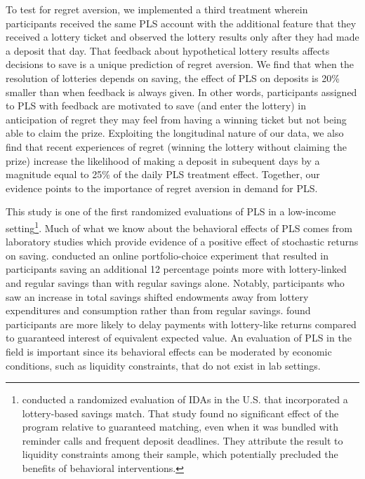 \documentclass[12pt, titlepage]{article}
\begin{document}
	To test for regret aversion, we implemented a third treatment wherein participants received the same PLS account with the additional feature that they received a lottery ticket and observed the lottery results only after they had made a deposit that day. That feedback about hypothetical lottery results affects decisions to save is a unique prediction of regret aversion. We find that when the resolution of lotteries depends on saving, the effect of PLS on deposits is 20\% smaller than when feedback is always given. In other words, participants assigned to PLS with feedback are motivated to save (and enter the lottery) in anticipation of regret they may feel from having a winning ticket but not being able to claim the prize. Exploiting the longitudinal nature of our data, we also find that recent experiences of regret (winning the lottery without claiming the prize) increase the likelihood of making a deposit in subequent days by a magnitude equal to 25\% of the daily PLS treatment effect. Together, our evidence points to the importance of regret aversion in demand for PLS.

	This study is one of the first randomized evaluations of PLS in a low-income setting\footnote{\textcite{loibl_testing_2016} conducted a randomized evaluation of IDAs in the U.S. that incorporated a lottery-based savings match. That study found no significant effect of the program relative to guaranteed matching, even when it was bundled with reminder calls and frequent deposit deadlines. They attribute the result to liquidity constraints among their sample, which potentially precluded the benefits of behavioral interventions.}. Much of what we know about the behavioral effects of PLS comes from laboratory studies which provide evidence of a positive effect of stochastic returns on saving. \textcite{atalay_savings_2014} conducted an online portfolio-choice experiment that resulted in participants saving an additional 12 percentage points more with lottery-linked and regular savings than with regular savings alone. Notably, participants who saw an increase in total savings shifted endowments away from lottery expenditures and consumption rather than from regular savings. \textcite{filiz-ozbay_lottery_2015} found participants are more likely to delay payments with lottery-like returns compared to guaranteed interest of equivalent expected value. An evaluation of PLS in the field is important since its behavioral effects can be moderated by economic conditions, such as liquidity constraints, that do not exist in lab settings.
\end{document}
